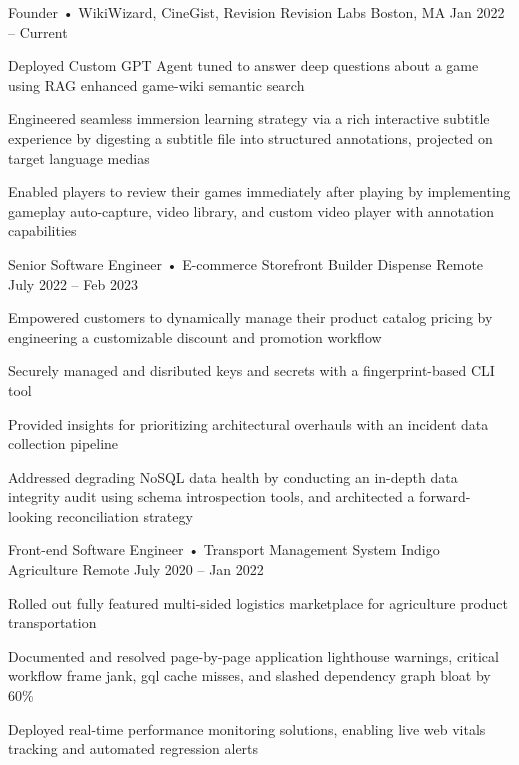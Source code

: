 \documentclass[]{awesome-cv}
\begin{document}
\begin{cventries}
	\cventry
	{Founder • WikiWizard, CineGist, Revision}
	{Revision Labs}
	{Boston, MA}
	{Jan 2022 – Current}
	{\begin{cvitems}
		\item {Deployed Custom GPT Agent tuned to answer deep questions about a game using RAG enhanced game-wiki semantic search}
		\item {Engineered seamless immersion learning strategy via a rich interactive subtitle experience by digesting a subtitle file into structured annotations, projected on target language medias}
		\item {Enabled players to review their games immediately after playing by implementing gameplay auto-capture, video library, and custom video player with annotation capabilities}
		\end{cvitems}}
	\cventry
	{Senior Software Engineer • E-commerce Storefront Builder}
	{Dispense}
	{Remote}
	{July 2022 – Feb 2023}
	{\begin{cvitems}
		\item {Empowered customers to dynamically manage their product catalog pricing by engineering a customizable discount and promotion workflow}
		\item {Securely managed and disributed keys and secrets with a fingerprint-based CLI tool}
		\item {Provided insights for prioritizing architectural overhauls with an incident data collection pipeline}
		\item {Addressed degrading NoSQL data health by conducting an in-depth data integrity audit using schema introspection tools, and architected a forward-looking reconciliation strategy}
		\end{cvitems}}
	\cventry
	{Front-end Software Engineer • Transport Management System}
	{Indigo Agriculture}
	{Remote}
	{July 2020 – Jan 2022}
	{\begin{cvitems}
		\item {Rolled out fully featured multi-sided logistics marketplace for agriculture product transportation}
		\item {Documented and resolved page-by-page application lighthouse warnings, critical workflow frame jank, gql cache misses, and slashed dependency graph bloat by 60\%}
		\item {Deployed real-time performance monitoring solutions, enabling live web vitals tracking and automated regression alerts}

\end{cvitems}}
\end{cventries}
\end{document}
